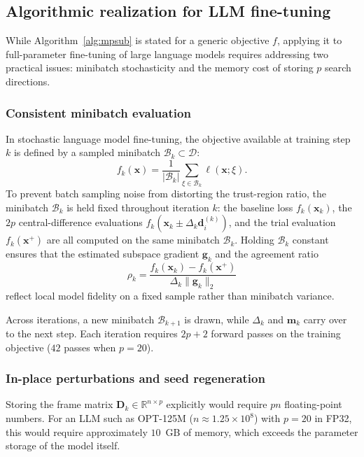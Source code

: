 \documentclass[smallextended]{svjour3}
\newcommand{\bx}{\bm{x}}
\newcommand{\bd}{\bm{d}}
\newcommand{\bg}{\bm{g}}
\begin{document}
\subsection{Algorithmic realization for LLM fine-tuning}
\label{subsec:llm_realization}

While Algorithm~\ref{alg:mpsub} is stated for a generic objective $f$, applying it to full-parameter fine-tuning of large language models requires addressing two practical issues: minibatch stochasticity and the memory cost of storing $p$ search directions.

\subsubsection{Consistent minibatch evaluation}
In stochastic language model fine-tuning, the objective available at training step $k$ is defined by a sampled minibatch $\mathcal B_k \subset \mathcal D$:
\begin{equation}
f_k(\bx) = \frac{1}{|\mathcal B_k|} \sum_{\xi \in \mathcal B_k} \ell(\bx; \xi).
\label{eq:minibatch_loss}
\end{equation}
To prevent batch sampling noise from distorting the trust-region ratio, the minibatch $\mathcal B_k$ is held fixed throughout iteration $k$: the baseline loss $f_k(\bx_k)$, the $2p$ central-difference evaluations $f_k(\bx_k \pm \Delta_k \bd_i^{(k)})$, and the trial evaluation $f_k(\bx^+)$ are all computed on the same minibatch $\mathcal B_k$. Holding $\mathcal B_k$ constant ensures that the estimated subspace gradient $\bg_k$ and the agreement ratio
\begin{equation}
\rho_k = \frac{f_k(\bx_k) - f_k(\bx^+)}{\Delta_k \|\bg_k\|_2}
\label{eq:minibatch_rho}
\end{equation}
reflect local model fidelity on a fixed sample rather than minibatch variance.

Across iterations, a new minibatch $\mathcal B_{k+1}$ is drawn, while $\Delta_k$ and $\bm m_k$ carry over to the next step. Each iteration requires $2p + 2$ forward passes on the training objective ($42$ passes when $p = 20$).

\subsubsection{In-place perturbations and seed regeneration}
Storing the frame matrix $\bm D_k \in \mathbb{R}^{n \times p}$ explicitly would require $pn$ floating-point numbers. For an LLM such as OPT-125M ($n \approx 1.25 \times 10^8$) with $p = 20$ in FP32, this would require approximately $10$~GB of memory, which exceeds the parameter storage of the model itself.
\end{document}
